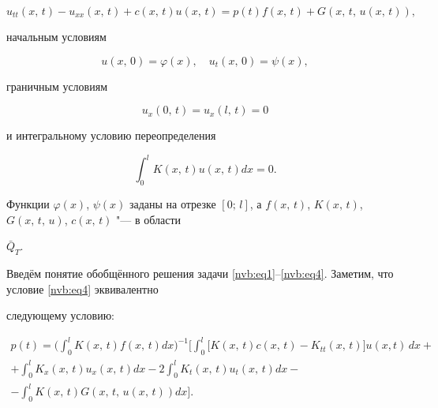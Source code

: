     \begin{equation}

    \label{nvb:eq1}

    u_{tt}(x,\,t)-u_{xx}(x,\,t)+c(x,\,t)u(x,\,t)=p(t)f(x,\,t)+G(x,\,t,\,u(x,\,t)),

    \end{equation}

начальным условиям

  \begin{equation}\label{nvb:eq2}

  u(x,\,0)=\varphi(x), \quad u_t(x,\,0)=\psi(x),

  \end{equation}

граничным условиям

    \begin{equation}\label{nvb:eq3}

    u_x(0,\,t)=u_x(l,\,t)=0

    \end{equation}

и интегральному условию переопределения

    \begin{equation}\label{nvb:eq4}

    \int_0^l K(x,\,t)u(x,\,t) dx=0.

    \end{equation}

Функции  $\varphi(x)$, $\psi(x)$ заданы на отрезке $[0;\,l]$, а $f(x,\,t)$, $K(x,\,t)$, $G(x,\,t,\,u)$, $c(x,\,t)$ "--- в области

$\bar Q_T$.



Введём понятие обобщённого решения задачи \eqref{nvb:eq1}--\eqref{nvb:eq4}. Заметим, что условие  \eqref{nvb:eq4} эквивалентно

следующему условию:

    \begin{multline}

    \label{nvb:eq5}

    p(t)=\biggl( \int _0^l K(x,\,t) f(x,\,t) dx\biggr)^{-1}\biggl[ \int _0^l\bigl[K(x,\,t)c(x,\,t)-K_{tt}(x,\,t) \bigr]u(x,t) \,

    dx+\\

    + \int _0^l K_x(x,\,t) u_x(x,\,t)dx -2\int _0^l K_t(x,\,t) u_t(x,\,t) dx- \\

    -\int _0^l K(x,\,t) G(x,\,t,\,u(x,\,t))dx \biggl].

    \end{multline}



